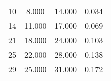 % 
\begin{tabular}{cccc}
  \hline
  \hline
10 & 8.000 & 14.000 & 0.034 \\ 
  14 & 11.000 & 17.000 & 0.069 \\ 
  21 & 18.000 & 24.000 & 0.103 \\ 
  25 & 22.000 & 28.000 & 0.138 \\ 
  29 & 25.000 & 31.000 & 0.172 \\ 
   \hline
\end{tabular}
